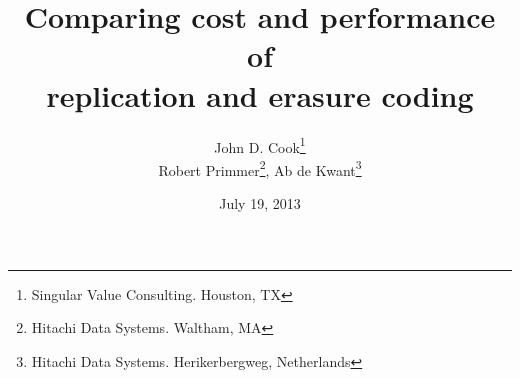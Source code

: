 \title{Comparing cost and performance of \\replication and erasure coding}
\author{John D. Cook\footnote{Singular Value Consulting. Houston, TX} \\
Robert Primmer\footnote{Hitachi Data Systems. Waltham, MA}, Ab de Kwant\footnote{Hitachi Data Systems. Herikerbergweg, Netherlands}}
\date{July 19, 2013}
